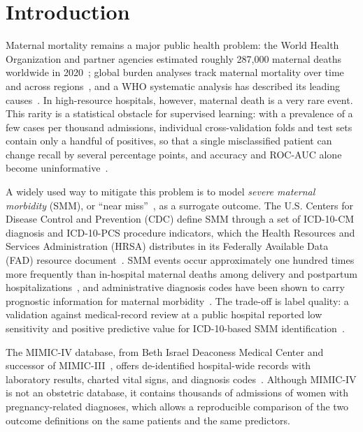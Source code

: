 \documentclass[healthcare,article,submit,pdftex,moreauthors]{Definitions/mdpi}
\begin{document}
\section{Introduction}
Maternal mortality remains a major public health problem: the World Health
Organization and partner agencies estimated roughly 287{,}000 maternal deaths
worldwide in 2020~\cite{WHO2023MMR}; global burden analyses track maternal mortality over time and across regions~\cite{Kassebaum2016GBD}, and a WHO systematic analysis has described its leading causes~\cite{Say2014Causes}. In high-resource hospitals, however, maternal
death is a very rare event. This rarity is a statistical obstacle for supervised
learning: with a prevalence of a few cases per thousand admissions, individual
cross-validation folds and test sets contain only a handful of positives, so that a
single misclassified patient can change recall by several percentage points, and
accuracy and ROC-AUC alone become uninformative~\cite{Marshall2023Imbalance,Saito2015PR}.

A widely used way to mitigate this problem is to model \emph{severe maternal
morbidity} (SMM), or ``near miss''~\cite{Say2009NearMiss}, as a surrogate outcome. The U.S. Centers for
Disease Control and Prevention (CDC) define SMM through a set of ICD-10-CM
diagnosis and ICD-10-PCS procedure indicators, which the Health Resources and
Services Administration (HRSA) distributes in its Federally Available Data (FAD)
resource document~\cite{CDC2023SMM,HRSA2023FAD}. SMM events occur approximately
one hundred times more frequently than in-hospital maternal deaths among delivery
and postpartum hospitalizations~\cite{Callaghan2012SMM}, and administrative
diagnosis codes have been shown to carry prognostic information for maternal
morbidity~\cite{Clapp2021Prenatal}. The trade-off is label quality: a validation
against medical-record review at a public hospital reported low sensitivity and
positive predictive value for ICD-10-based SMM identification~\cite{Boulet2024ICD10SMM}.

The MIMIC-IV database, from Beth Israel Deaconess Medical Center and successor of MIMIC-III~\cite{Johnson2016MIMICIII}, offers
de-identified hospital-wide records with laboratory results, charted vital signs,
and diagnosis codes~\cite{Johnson2023MIMICIV,Goldberger2000PhysioNet}. Although
MIMIC-IV is not an obstetric database, it contains thousands of admissions of women
with pregnancy-related diagnoses, which allows a reproducible comparison of the two
outcome definitions on the same patients and the same predictors.
\end{document}
